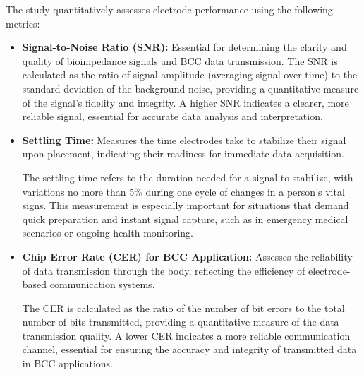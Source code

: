 \documentclass[conference]{IEEEtran}
\begin{document}
The study quantitatively assesses electrode performance using the following metrics:
\begin{itemize}
    \item \textbf{Signal-to-Noise Ratio (SNR):} Essential for determining the clarity and quality of bioimpedance signals and BCC data transmission.
    The SNR is calculated as the ratio of signal amplitude (averaging signal over time) to the standard deviation of the background noise, providing a quantitative measure of the signal's fidelity and integrity. A higher SNR indicates a clearer, more reliable signal, essential for accurate data analysis and interpretation.
    
    \item \textbf{Settling Time:} Measures the time electrodes take to stabilize their signal upon placement, indicating their readiness for immediate data acquisition.
    
    The settling time refers to the duration needed for a signal to stabilize, with variations no more than 5\% during one cycle of changes in a person's vital signs. This measurement is especially important for situations that demand quick preparation and instant signal capture, such as in emergency medical scenarios or ongoing health monitoring.
    
    \item \textbf{Chip Error Rate (CER) for BCC Application:} Assesses the reliability of data transmission through the body, reflecting the efficiency of electrode-based communication systems.
    
    The CER is calculated as the ratio of the number of bit errors to the total number of bits transmitted, providing a quantitative measure of the data transmission quality. A lower CER indicates a more reliable communication channel, essential for ensuring the accuracy and integrity of transmitted data in BCC applications.
    
\end{itemize}
\end{document}
